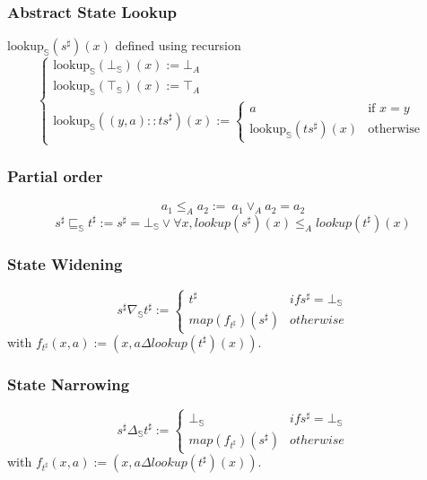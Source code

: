 \documentclass{beamer}
\begin{document}
\begin{frame}
    \frametitle{Abstract State Lookup}
    \( \text{lookup}_\mathbb{S}(s^{\sharp}) (x)\) defined using recursion
    \[
    \begin{cases}
        \text{lookup}_\mathbb{S}(\bot_\mathbb{S})(x) := \bot_A \\  
        \text{lookup}_\mathbb{S}(\top_\mathbb{S})(x) := \top_A \\
        \text{lookup}_\mathbb{S}((y, a) :: {ts}^{\sharp}) (x) := \begin{cases}
            a & \text{if } x = y \\
            \text{lookup}_\mathbb{S}(ts^{\sharp})(x) & \text{otherwise}
            \end{cases} 
        \end{cases}
    \]
\end{frame}























\begin{frame}
    \frametitle{Partial order}
    \[
        a_1 \le_A a_2 :=\ a_1 \vee_A a_2 = a_2
    \]
    \[ 
        s^{\sharp} \sqsubseteq_\mathbb{S} t^{\sharp} := s^{\sharp} = \bot_\mathbb{S} \vee \forall x, lookup (s^{\sharp}) (x) \le_A lookup (t^{\sharp}) (x)
    \]
\end{frame}



\begin{frame}
    \frametitle{State Widening}
    \[ s^{\sharp} \nabla_\mathbb{S} t^{\sharp} := \begin{cases}
                                                    t^{\sharp}       & if s^{\sharp} = \bot_\mathbb{S}\\
                                                    map (f_{t^{\sharp}}) (s^{\sharp}) & otherwise
                                                    \end{cases} \]
    with \( f_{t^{\sharp}}(x, a) := (x, a \Delta lookup (t^{\sharp}) (x)) \).
\end{frame}

\begin{frame}
    \frametitle{State Narrowing}
    \[ s^{\sharp} \Delta_\mathbb{S} t^{\sharp} := \begin{cases}
                                                    \bot_\mathbb{S} & if s^{\sharp} = \bot_\mathbb{S}\\
                                                    map (f_{t^{\sharp}}) (s^{\sharp}) & otherwise
                                                    \end{cases} \]
    with \( f_{t^{\sharp}}(x, a) := (x, a \Delta lookup (t^{\sharp}) (x)) \).
\end{frame}
\end{document}
